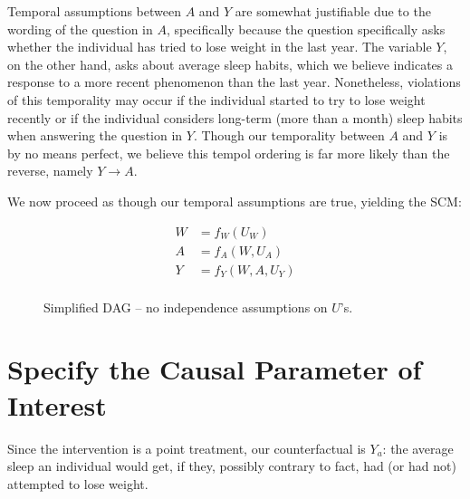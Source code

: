 \documentclass{article}
\begin{document}
Temporal assumptions between $A$ and $Y$ are somewhat justifiable due to the wording of the question in $A$, specifically because the question specifically asks whether the individual has tried to lose weight in the last year. The variable $Y$, on the other hand, asks about average sleep habits, which we believe indicates a response to a more recent phenomenon than the last year. Nonetheless, violations of this temporality may occur if the individual started to try to lose weight recently or if the individual considers long-term (more than a month) sleep habits when answering the question in $Y$. Though our temporality between $A$ and $Y$ is by no means perfect, we believe this tempol ordering is far more likely than the reverse, namely $Y\rightarrow A$. 

We now proceed as though our temporal assumptions are true, yielding the SCM:

\begin{align*}
W &= f_{W}(U_{W}) \\
A &= f_{A}(W,U_{A}) \\
Y &= f_{Y}(W,A,U_{Y}) \\
\end{align*}

\begin{figure}[h]
    \centering
  \caption{Simplified DAG -- no independence assumptions on $U$'s.}
  \label{fig:DAG}
\end{figure}


\section{Specify the Causal Parameter of Interest}

Since the intervention is a point treatment, our counterfactual is $Y_{a}$: the average sleep an individual would get, if they, possibly contrary to fact, had (or had not) attempted to lose weight.
\end{document}

